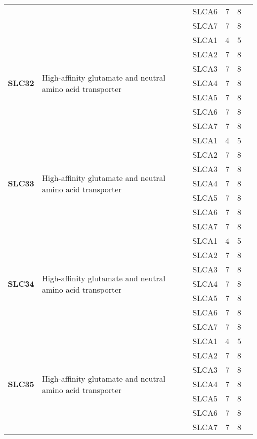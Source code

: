 \documentclass[12pt]{report}
\begin{document}
\begin{center}
\begin{longtable}{|p{1.5cm}|p{3.2cm}|p{1.9cm}|p{1.65cm}|p{3cm}|p{3cm}|}
\cline{3-6}
&&SLCA6&7 & 8&\\ 
\cline{3-6}
&&SLCA7&7 & 8&\\ 
\hline
\multirow{7}{1.5cm}{\textbf{SLC32}} & \multirow{7}{4cm}{High-affinity glutamate and neutral amino acid transporter} & SLCA1 & 4 & 5\\ 
\cline{3-6}
&&SLCA2&7 & 8&\\ 
\cline{3-6}
&&SLCA3&7 & 8&\\ 
\cline{3-6}
&&SLCA4&7 & 8&\\ 
\cline{3-6}
&&SLCA5&7 & 8&\\ 
\cline{3-6}
&&SLCA6&7 & 8&\\ 
\cline{3-6}
&&SLCA7&7 & 8&\\ 
\hline
\multirow{7}{1.5cm}{\textbf{SLC33}} & \multirow{7}{4cm}{High-affinity glutamate and neutral amino acid transporter} & SLCA1 & 4 & 5\\ 
\cline{3-6}
&&SLCA2&7 & 8&\\ 
\cline{3-6}
&&SLCA3&7 & 8&\\ 
\cline{3-6}
&&SLCA4&7 & 8&\\ 
\cline{3-6}
&&SLCA5&7 & 8&\\ 
\cline{3-6}
&&SLCA6&7 & 8&\\ 
\cline{3-6}
&&SLCA7&7 & 8&\\ 
\hline
\multirow{7}{1.5cm}{\textbf{SLC34}} & \multirow{7}{4cm}{High-affinity glutamate and neutral amino acid transporter} & SLCA1 & 4 & 5\\ 
\cline{3-6}
&&SLCA2&7 & 8&\\ 
\cline{3-6}
&&SLCA3&7 & 8&\\ 
\cline{3-6}
&&SLCA4&7 & 8&\\ 
\cline{3-6}
&&SLCA5&7 & 8&\\ 
\cline{3-6}
&&SLCA6&7 & 8&\\ 
\cline{3-6}
&&SLCA7&7 & 8&\\ 
\hline
\multirow{7}{1.5cm}{\textbf{SLC35}} & \multirow{7}{4cm}{High-affinity glutamate and neutral amino acid transporter} & SLCA1 & 4 & 5\\ 
\cline{3-6}
&&SLCA2&7 & 8&\\ 
\cline{3-6}
&&SLCA3&7 & 8&\\ 
\cline{3-6}
&&SLCA4&7 & 8&\\ 
\cline{3-6}
&&SLCA5&7 & 8&\\ 
\cline{3-6}
&&SLCA6&7 & 8&\\ 
\cline{3-6}
&&SLCA7&7 & 8&\\ 

\end{longtable}
\end{center}
\end{document}

